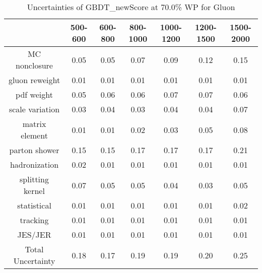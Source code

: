 \begin{table}
\centering
\caption{Uncertainties of GBDT_newScore at 70.0\% WP for Gluon}
\label{tab:syst_GBDT_newScore_0.7_Gluon}
\begin{tabular}{ccccccc}
\toprule
{} &  500-600 &  600-800 &  800-1000 &  1000-1200 &  1200-1500 &  1500-2000 \\
\midrule
MC nonclosure     &     0.05 &     0.05 &      0.07 &       0.09 &       0.12 &       0.15 \\
gluon reweight    &     0.01 &     0.01 &      0.01 &       0.01 &       0.01 &       0.01 \\
pdf weight        &     0.05 &     0.06 &      0.06 &       0.07 &       0.07 &       0.06 \\
scale variation   &     0.03 &     0.04 &      0.03 &       0.04 &       0.04 &       0.07 \\
matrix element    &     0.01 &     0.01 &      0.02 &       0.03 &       0.05 &       0.08 \\
parton shower     &     0.15 &     0.15 &      0.17 &       0.17 &       0.17 &       0.21 \\
hadronization     &     0.02 &     0.01 &      0.01 &       0.01 &       0.01 &       0.01 \\
splitting kernel  &     0.07 &     0.05 &      0.05 &       0.04 &       0.03 &       0.05 \\
statistical       &     0.01 &     0.01 &      0.01 &       0.01 &       0.01 &       0.02 \\
tracking          &     0.01 &     0.01 &      0.01 &       0.01 &       0.01 &       0.01 \\
JES/JER           &     0.01 &     0.01 &      0.01 &       0.01 &       0.01 &       0.01 \\
Total Uncertainty &     0.18 &     0.17 &      0.19 &       0.19 &       0.20 &       0.25 \\
\bottomrule
\end{tabular}
\end{table}
